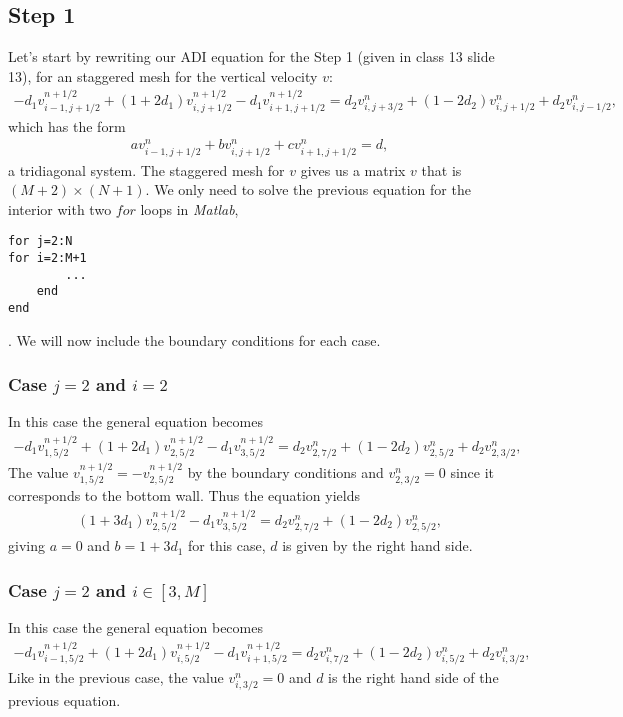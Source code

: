\subsection{Step 1}
Let's start by rewriting our ADI equation for the Step 1 (given in class 13 slide 13), for an staggered mesh for the vertical velocity $v$:
\begin{align*}
-d_1v_{i-1,j+1/2}^{n+1/2}+(1+2d_1)v_{i,j+1/2}^{n+1/2}-d_1v_{i+1,j+1/2}^{n+1/2}=d_2v_{i,j+3/2}^{n}+(1-2d_2)v_{i,j+1/2}^{n}+d_2v_{i,j-1/2}^{n},
\end{align*}
which has the form 
\begin{align*}
av_{i-1,j+1/2}^{n}+bv_{i,j+1/2}^{n}+cv_{i+1,j+1/2}^{n}=d,
\end{align*}
a tridiagonal system. The staggered mesh for $v$ gives us a matrix $v$ that is $(M+2)\times(N+1)$. We only need to solve the previous equation for the interior with two $for$ loops in \textsl{Matlab},
\begin{verbatim}
for j=2:N
for i=2:M+1
		...
	end
end
\end{verbatim}.
We will now include the boundary conditions for each case.
\subsubsection*{Case $j=2$ and $i=2$}
In this case the general equation becomes
\begin{align*}
-d_1v_{1,5/2}^{n+1/2}+(1+2d_1)v_{2,5/2}^{n+1/2}-d_1v_{3,5/2}^{n+1/2}=d_2v_{2,7/2}^{n}+(1-2d_2)v_{2,5/2}^{n}+d_2v_{2,3/2}^{n},
\end{align*}
The value $v_{1,5/2}^{n+1/2}=-v_{2,5/2}^{n+1/2}$ by the boundary conditions and $v_{2,3/2}^{n}=0$ since it corresponds to the bottom wall. Thus the equation yields
\begin{align*}
(1+3d_1)v_{2,5/2}^{n+1/2}-d_1v_{3,5/2}^{n+1/2}=d_2v_{2,7/2}^{n}+(1-2d_2)v_{2,5/2}^{n},
\end{align*}
giving $a=0$ and $b=1+3d_1$ for this case, $d$ is given by the right hand side.
\subsubsection*{Case $j=2$ and $i\in [3,M]$}
In this case the general equation becomes
\begin{align*}
-d_1v_{i-1,5/2}^{n+1/2}+(1+2d_1)v_{i,5/2}^{n+1/2}-d_1v_{i+1,5/2}^{n+1/2}=d_2v_{i,7/2}^{n}+(1-2d_2)v_{i,5/2}^{n}+d_2v_{i,3/2}^{n},
\end{align*}
Like in the previous case, the value $v_{i,3/2}^{n}=0$ and $d$ is the right hand side of the previous equation.

